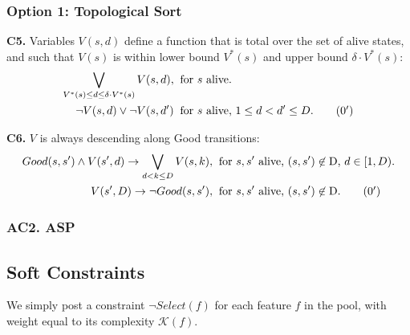 \documentclass[a4paper]{article}
\newcommand{\smallpar}[1]{{\vspace{10pt}\noindent \bf #1.}}
\newcommand{\badtx}{\ensuremath{\mathrm{D}}}
\begin{document}
\subsubsection{Option 1: Topological Sort}


\smallpar{C5}
Variables $V(s, d)$ define a function that is total over the set of alive states,
and such that $V(s)$ is within lower bound $V^*(s)$ and upper bound $\delta \cdot V^*(s)$:
\begin{align}
 \bigvee_{V^*(s) \leq d \leq \delta \cdot V^*(s)} V(s,d),&\;\; \text{for $s$ alive.} \\
 \neg V(s, d) \lor \neg V(s, d')&\;\; \text{for $s$ alive, $1 \leq d < d' \leq D$.} \tag{\theequation${}^\prime$}
\end{align}


\smallpar{C6}
$V$ is always descending along Good transitions:
\begin{align}
 Good(s, s') \land V(s', d) \rightarrow \bigvee_{d < k \leq D} V(s, k),&\;\; \text{for $s, s'$ alive, $(s, s') \not\in \badtx$, $d \in [1, D)$.} \\
 V(s', D) \rightarrow \neg Good(s, s'),&\;\; \text{for $s, s'$ alive, $(s, s') \not\in \badtx$.} \tag{\theequation${}^\prime$}
\end{align}




\subsubsection{AC2. ASP}


\subsection{Soft Constraints}
We simply post a constraint $\neg Select(f)$ for each feature $f$ in the pool, with weight equal to its complexity $\mathcal{K}(f)$.
\end{document}
